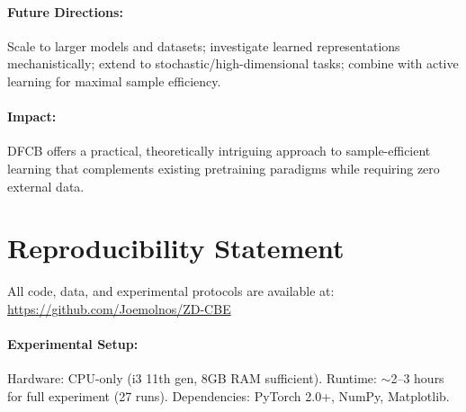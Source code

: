 \documentclass[11pt,twocolumn]{article}
\newcommand{\method}{DFCB}
\begin{document}
\paragraph{Future Directions:}
Scale to larger models and datasets; investigate learned representations mechanistically; extend to stochastic/high-dimensional tasks; combine with active learning for maximal sample efficiency.

\paragraph{Impact:}
\method{} offers a practical, theoretically intriguing approach to sample-efficient learning that complements existing pretraining paradigms while requiring zero external data.

\section*{Reproducibility Statement}

All code, data, and experimental protocols are available at: \\
\url{https://github.com/Joemolnos/ZD-CBE}

\paragraph{Experimental Setup:}
Hardware: CPU-only (i3 11th gen, 8GB RAM sufficient). Runtime: $\sim$2--3 hours for full experiment (27 runs). Dependencies: PyTorch 2.0+, NumPy, Matplotlib.
\end{document}
